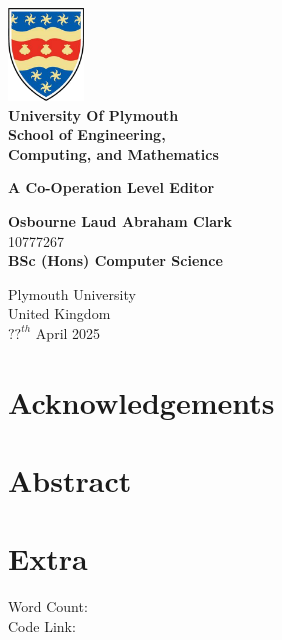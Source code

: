 \begin{titlepage}
  \begin{center}
    \includegraphics[width=0.15\textwidth]{./plymouthUniLogo2}\\
    \large
    \textbf{University Of Plymouth}\\
    \vspace{0.15cm}
    \large
    \textbf{School of Engineering,\\ Computing, and Mathematics}
    
    \vspace{1.9cm}
    \Huge
    \textbf{A Co-Operation Level Editor}
    
    \vspace{4.5cm}
    \Large
    \textbf{Osbourne Laud Abraham Clark}\\
    10777267\\
    \large
   \textbf{ BSc (Hons) Computer Science}
    
    \vspace{1.5cm}
      

    \large
    Plymouth University\\
    United Kingdom\\
    $??^{th}$ April 2025
    
    
    
  \end{center}
\end{titlepage}


\section*{Acknowledgements}

\section*{Abstract}

\section*{Extra}
Word Count:\\
Code Link:

